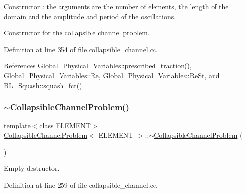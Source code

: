 Constructor \+: the arguments are the number of elements, the length of the domain and the amplitude and period of the oscillations. 

Constructor for the collapsible channel problem. 

Definition at line 354 of file collapsible\+\_\+channel.\+cc.



References Global\+\_\+\+Physical\+\_\+\+Variables\+::prescribed\+\_\+traction(), Global\+\_\+\+Physical\+\_\+\+Variables\+::\+Re, Global\+\_\+\+Physical\+\_\+\+Variables\+::\+Re\+St, and B\+L\+\_\+\+Squash\+::squash\+\_\+fct().

\mbox{\label{classCollapsibleChannelProblem_a205e3e654d3205d1d55ac46e7b63ca9d}} 
\subsubsection{\texorpdfstring{$\sim$\+Collapsible\+Channel\+Problem()}{~CollapsibleChannelProblem()}\hspace{0.1cm}{\footnotesize\ttfamily [1/2]}}
{\footnotesize\ttfamily template$<$class E\+L\+E\+M\+E\+NT$>$ \\
\hyperlink{classCollapsibleChannelProblem}{Collapsible\+Channel\+Problem}$<$ E\+L\+E\+M\+E\+NT $>$\+::$\sim$\hyperlink{classCollapsibleChannelProblem}{Collapsible\+Channel\+Problem} (\begin{DoxyParamCaption}{ }\end{DoxyParamCaption})\hspace{0.3cm}{\ttfamily [inline]}}



Empty destructor. 



Definition at line 259 of file collapsible\+\_\+channel.\+cc.

\mbox{\label{classCollapsibleChannelProblem_ab43fa30667f57e8019c8b30fd93156f8}} 
